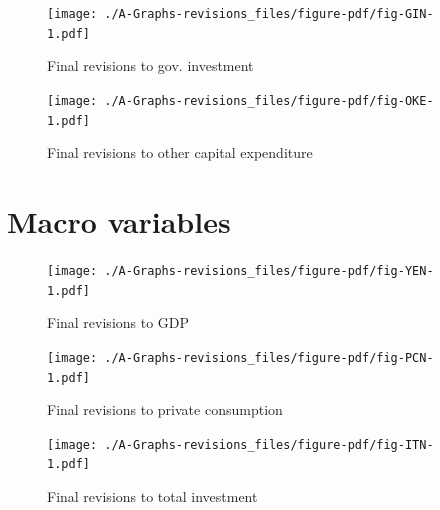 \documentclass[
  letterpaper,
  authoryear,
  preprint,
  3p]{elsarticle}
\begin{document}
\begin{figure}[H]

{\centering \texttt{[image: ./A-Graphs-revisions\_files/figure-pdf/fig-GIN-1.pdf]}

}

\caption{\label{fig-GIN}Final revisions to gov. investment}

\end{figure}

\pagebreak

\begin{figure}[H]

{\centering \texttt{[image: ./A-Graphs-revisions\_files/figure-pdf/fig-OKE-1.pdf]}

}

\caption{\label{fig-OKE}Final revisions to other capital expenditure}

\end{figure}

\hypertarget{macro-variables}{%
\section{Macro variables}\label{macro-variables}}

\begin{figure}[H]

{\centering \texttt{[image: ./A-Graphs-revisions\_files/figure-pdf/fig-YEN-1.pdf]}

}

\caption{\label{fig-YEN}Final revisions to GDP}

\end{figure}

\pagebreak

\begin{figure}[H]

{\centering \texttt{[image: ./A-Graphs-revisions\_files/figure-pdf/fig-PCN-1.pdf]}

}

\caption{\label{fig-PCN}Final revisions to private consumption}

\end{figure}

\pagebreak

\begin{figure}[H]

{\centering \texttt{[image: ./A-Graphs-revisions\_files/figure-pdf/fig-ITN-1.pdf]}

}

\caption{\label{fig-ITN}Final revisions to total investment}

\end{figure}
\end{document}
